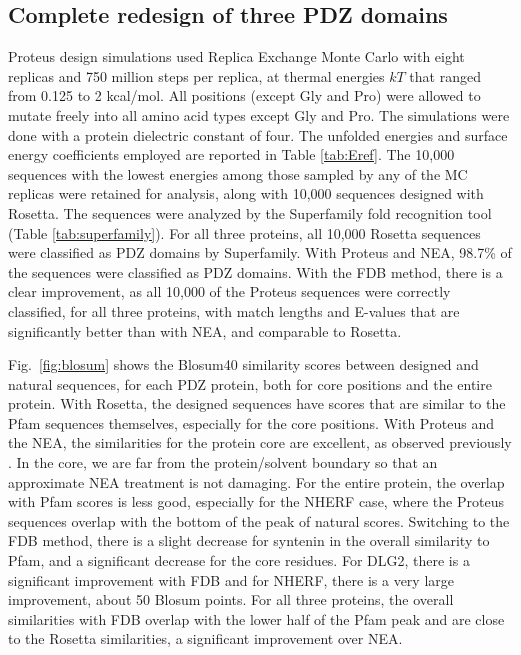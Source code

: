 \documentclass[a4paper,12pt]{article}
\begin{document}
\subsection{Complete redesign of three PDZ domains}
Proteus design simulations used Replica Exchange Monte Carlo with eight replicas and 750 million steps per replica, at
thermal energies $kT$ that ranged from 0.125 to 2 kcal/mol. All positions (except Gly and Pro) were allowed to mutate
freely into all amino acid types except Gly and Pro. The simulations were done with a protein dielectric constant of
four. The unfolded energies and surface energy coefficients employed are reported in Table \ref{tab:Eref}. The 10,000
sequences with the lowest energies among those sampled by any of the MC replicas were retained for analysis, along
with 10,000 sequences designed with Rosetta. The sequences were analyzed by the Superfamily fold recognition tool
\cite{Madera04,Wilson07} (Table \ref{tab:superfamily}). For all three proteins, all 10,000 Rosetta sequences were
classified as PDZ domains by Superfamily. With Proteus and NEA, 98.7\% of the sequences were classified as PDZ
domains. With the FDB method, there is a clear improvement, as all 10,000 of the Proteus sequences were correctly
classified, for all three proteins, with match lengths and E-values that are significantly better than with NEA,
and comparable to Rosetta.

Fig.\ \ref{fig:blosum} shows the Blosum40 similarity scores between designed and natural sequences, for each PDZ
protein, both for core positions and the entire protein. With Rosetta, the designed sequences have scores that
are similar to the Pfam sequences themselves, especially for the core positions. With Proteus and the NEA, the
similarities for the protein core are excellent, as observed previously \cite{Mignon17}. In the core, we are
far from the protein/solvent boundary so that an approximate NEA treatment is not damaging. For the entire protein,
the overlap with Pfam scores is less good, especially for the NHERF case, where the Proteus sequences overlap with
the bottom of the peak of natural scores. Switching to the FDB method, there is a slight decrease for syntenin in
the overall similarity to Pfam, and a significant decrease for the core residues. For DLG2, there is a significant
improvement with FDB and for NHERF, there is a very large improvement, about 50 Blosum points. For all three
proteins, the overall similarities with FDB overlap with the lower half of the Pfam peak and are close to the
Rosetta similarities, a significant improvement over NEA.
\end{document}
